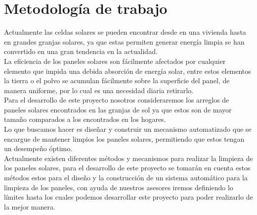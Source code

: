 \chapter{Metodología de trabajo}\label{Cap5}
Actualmente las celdas solares se pueden encontrar desde en una vivienda hasta en grandes granjas solares, ya que estas permiten generar energía limpia se han convertido en una gran tendencia en la actualidad. \\

La eficiencia de los paneles solares son fácilmente afectados por cualquier elemento que impida una debida absorción de energía solar, entre estos elementos la tierra o el polvo se acumulan fácilmente sobre la superficie del panel, de manera uniforme, por lo cual es una necesidad diaria retirarlo.\\

Para el desarrollo de este proyecto nosotros consideraremos los arreglos de paneles solares encontrados en las granjas de sol ya que estos son de mayor tamaño comparados a los encontrados en los hogares. \\

Lo que buscamos hacer es diseñar y construir un mecanismo automatizado que se encargue de mantener limpios los paneles solares, permitiendo que estos tengan un desempeño óptimo. \\

Actualmente existen diferentes métodos y mecanismos para realizar la limpieza de los paneles solares, para el desarrollo de este proyecto se tomarán en cuenta estos métodos estos para el diseño y la construcción de un sistema automático para la limpieza de los paneles, con ayuda de nuestros asesores iremos definiendo lo límites hasta los cuales podemos desarrollar este proyecto para poder realizarlo de la mejor manera.
